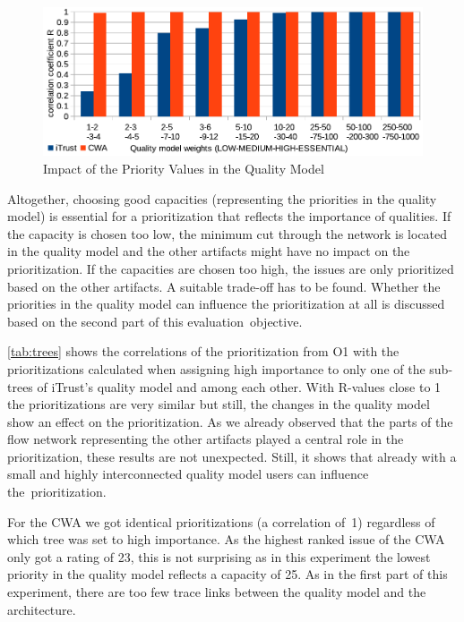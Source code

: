 \begin{figure}
    \centering
    \includegraphics[width=.75\columnwidth]{figures/impact-qm-weights.pdf}
    \caption{Impact of the Priority Values in the Quality Model}
    \label{fig:weights}
\end{figure}

Altogether, choosing good capacities (representing the priorities in the quality model) is essential for a prioritization that reflects the importance of qualities.
If the capacity is chosen too low, the minimum cut through the network is located in the quality model and the other artifacts might have no impact on the prioritization.
If the capacities are chosen too high, the issues are only prioritized based on the other artifacts.
A suitable trade-off has to be found.
Whether the priorities in the quality model can influence the prioritization at all is discussed based on the second part of this evaluation~objective.


\autoref{tab:trees} shows the correlations of the prioritization from O1 with the prioritizations calculated when assigning high importance to only one of the sub-trees of iTrust's quality model and among each other.
With R-values close to 1 the
prioritizations are very similar but still, the changes in the quality model show an effect on the prioritization.
As we already observed that the parts of the flow network representing the other artifacts played a central role in the prioritization, these results are not unexpected.
Still, it shows that already with a small and highly interconnected quality model users can influence the~prioritization.

For the CWA we got identical prioritizations (a correlation of~1) regardless of which tree was set to high importance.
As the highest ranked issue of the CWA only got a rating of 23, this is not surprising as in this experiment the lowest priority in the quality model reflects a capacity of 25.
As in the first part of this experiment, there are too few trace links between the quality model and the architecture.

